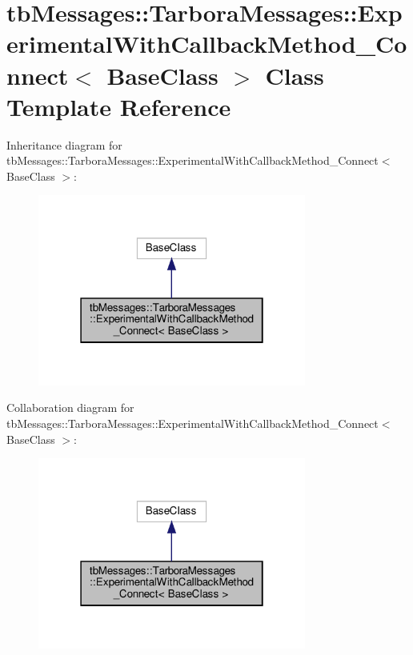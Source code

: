 \hypertarget{classtbMessages_1_1TarboraMessages_1_1ExperimentalWithCallbackMethod__Connect}{}\section{tb\+Messages\+:\+:Tarbora\+Messages\+:\+:Experimental\+With\+Callback\+Method\+\_\+\+Connect$<$ Base\+Class $>$ Class Template Reference}
\label{classtbMessages_1_1TarboraMessages_1_1ExperimentalWithCallbackMethod__Connect}


Inheritance diagram for tb\+Messages\+:\+:Tarbora\+Messages\+:\+:Experimental\+With\+Callback\+Method\+\_\+\+Connect$<$ Base\+Class $>$\+:
\nopagebreak
\begin{figure}[H]
\begin{center}
\leavevmode
\includegraphics[width=250pt]{classtbMessages_1_1TarboraMessages_1_1ExperimentalWithCallbackMethod__Connect__inherit__graph}
\end{center}
\end{figure}


Collaboration diagram for tb\+Messages\+:\+:Tarbora\+Messages\+:\+:Experimental\+With\+Callback\+Method\+\_\+\+Connect$<$ Base\+Class $>$\+:
\nopagebreak
\begin{figure}[H]
\begin{center}
\leavevmode
\includegraphics[width=250pt]{classtbMessages_1_1TarboraMessages_1_1ExperimentalWithCallbackMethod__Connect__coll__graph}
\end{center}
\end{figure}
